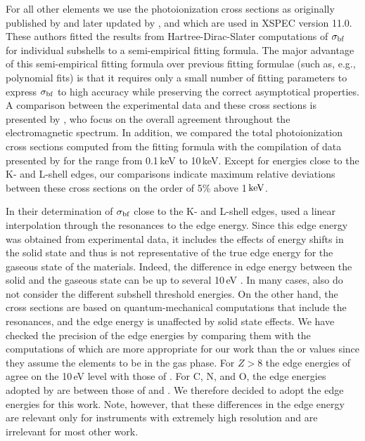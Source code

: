 \documentclass{aastex}
\newcommand{\sbf}{\ensuremath{\sigma_{\rm bf}}}
\newcommand{\keV}{\ensuremath{\rm keV}}
\begin{document}
For all other elements we use the photoionization cross sections
as originally published by \citet{verner:93a} and later updated
by \citet{verner:95a}, and which are used in XSPEC version 11.0. 
These authors fitted the results from
Hartree-Dirac-Slater computations of $\sbf$ for individual
subshells to a semi-empirical fitting formula. The major
advantage of this semi-empirical fitting formula over previous
fitting formulae (such as, e.g., polynomial fits) is that it
requires only a small number of fitting parameters to express
$\sbf$ to high accuracy while preserving the correct asymptotical
properties.  A comparison between the experimental data and these
cross sections is presented by \citet{verner:95a}, who focus on
the overall agreement throughout the electromagnetic spectrum. In
addition, we compared the total photoionization cross sections
computed from the fitting formula with the compilation of data
presented by \citet{henke:93a} for the range from 0.1\,keV to
10\,keV.  Except for energies close to the K- and L-shell edges,
our comparisons indicate maximum relative deviations between
these cross sections on the order of 5\% above 1\,\keV.

In their determination of $\sbf$ close to the K- and L-shell
edges, \citet{henke:93a} used a linear interpolation through the
resonances to the edge energy. Since this edge energy was
obtained from experimental data, it includes the effects of
energy shifts in the solid state and thus is not representative
of the true edge energy for the gaseous state of the materials.
Indeed, the difference in edge energy between the solid and the
gaseous state can be up to several 10\,eV \citep[see, e.g.,
][for an illustrative experimental example]{nicolosi:91a}.  In
many cases, \citeauthor{henke:93a} also do not consider
the different subshell threshold energies.  On the
other hand, the \citet{verner:95a} cross sections are based on
quantum-mechanical computations that include the resonances, and
the edge energy is unaffected by solid state effects. We have
checked the precision of the \citeauthor{verner:95a} edge
energies by comparing them with the computations of
\citet{gould:91a} which are more appropriate for our work than
the \citet{henke:82a} or \citet{henke:93a} values since they
assume the elements to be in the gas phase.  For $Z>8$ the edge
energies of \citet{verner:95a} agree on the 10\,eV level with
those of \citet{gould:91a}.  For C, N, and O, the edge energies
adopted by \citet{verner:95a} are between those of
\citet{henke:93a} and \citet{gould:91a}. We therefore decided to
adopt the \citeauthor{verner:95a} edge energies for this work.
Note, however, that these differences in the edge energy are
relevant only for instruments with extremely high resolution and
are irrelevant for most other work.
\end{document}
